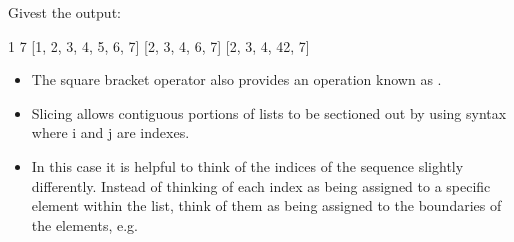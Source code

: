 \documentclass[letterpaper,10pt,english,openany]{sphinxmanual}
\begin{document}
\begin{sphinxVerbatim}[commandchars=\\\{\}]
  \PYG{p}{[}\PYG{p}{]}

  

\PYG{p}{[}\PYG{p}{]}
\PYG{p}{[}\PYG{p}{]}
 
 \PYG{p}{[}\PYG{p}{]}  

\PYG{p}{[}\PYG{p}{]}  
\end{sphinxVerbatim}

Givest the output:

\begin{sphinxVerbatim}[commandchars=\\\{\}]
1
7
[1, 2, 3, 4, 5, 6, 7]
[2, 3, 4, 6, 7]
[2, 3, 4, 42, 7]
\end{sphinxVerbatim}
\begin{itemize}
\item {} 
The square bracket operator also provides an operation known as
.

\item {} 
Slicing allows contiguous portions of lists to be sectioned out by
using \sphinxcode{\sphinxupquote{{[}i:j{]}}} syntax where i and j are indexes.

\item {} 
In this case it is helpful to think of the indices of the sequence
slightly differently. Instead of thinking of each index as being
assigned to a specific element within the list, think of them as
being assigned to the boundaries of the elements, e.g.

\end{itemize}
\end{document}
